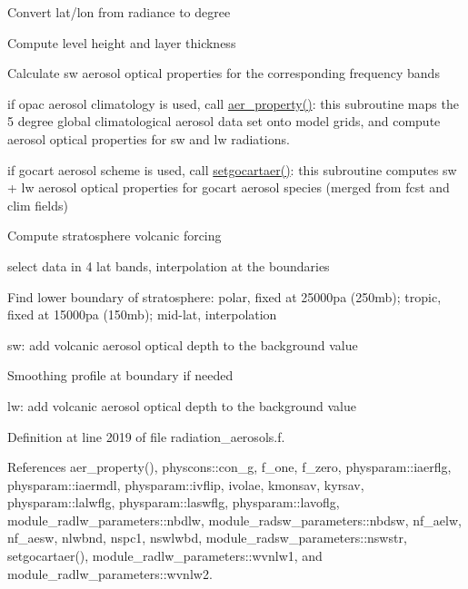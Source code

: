 \begin{DoxyEnumerate}
\item Convert lat/lon from radiance to degree
\item Compute level height and layer thickness
\item Calculate sw aerosol optical properties for the corresponding frequency bands
\begin{DoxyItemize}
\item if opac aerosol climatology is used, call \hyperlink{namespacemodule__radiation__aerosols_a0c8525abbb12f5f03e3c136c851c11bd}{aer\+\_\+property()}\+: this subroutine maps the 5 degree global climatological aerosol data set onto model grids, and compute aerosol optical properties for sw and lw radiations.
\item if gocart aerosol scheme is used, call \hyperlink{namespacemodule__radiation__aerosols_abb28d29c21a8905eda601bfe5bfb3df4}{setgocartaer()}\+: this subroutine computes sw + lw aerosol optical properties for gocart aerosol species (merged from fcst and clim fields)
\end{DoxyItemize}
\item Compute stratosphere volcanic forcing
\begin{DoxyItemize}
\item select data in 4 lat bands, interpolation at the boundaries
\item Find lower boundary of stratosphere\+: polar, fixed at 25000pa (250mb); tropic, fixed at 15000pa (150mb); mid-\/lat, interpolation
\item sw\+: add volcanic aerosol optical depth to the background value
\item Smoothing profile at boundary if needed
\item lw\+: add volcanic aerosol optical depth to the background value 
\end{DoxyItemize}
\end{DoxyEnumerate}

Definition at line 2019 of file radiation\+\_\+aerosols.\+f.



References aer\+\_\+property(), physcons\+::con\+\_\+g, f\+\_\+one, f\+\_\+zero, physparam\+::iaerflg, physparam\+::iaermdl, physparam\+::ivflip, ivolae, kmonsav, kyrsav, physparam\+::lalwflg, physparam\+::laswflg, physparam\+::lavoflg, module\+\_\+radlw\+\_\+parameters\+::nbdlw, module\+\_\+radsw\+\_\+parameters\+::nbdsw, nf\+\_\+aelw, nf\+\_\+aesw, nlwbnd, nspc1, nswlwbd, module\+\_\+radsw\+\_\+parameters\+::nswstr, setgocartaer(), module\+\_\+radlw\+\_\+parameters\+::wvnlw1, and module\+\_\+radlw\+\_\+parameters\+::wvnlw2.



